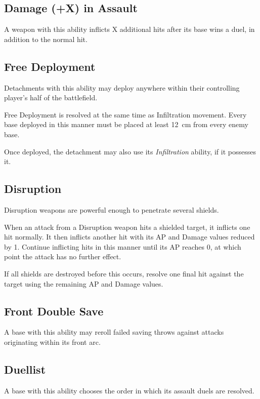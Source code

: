 \subsection{Damage (+X) in Assault}

A weapon with this ability inflicts X additional hits after its base wins a duel, in addition to the normal hit.

\subsection{Free Deployment}

Detachments with this ability may deploy anywhere within their controlling player's half of the battlefield.

Free Deployment is resolved at the same time as Infiltration movement. Every base deployed in this manner must be placed at least 12~cm from every enemy base.

Once deployed, the detachment may also use its \textit{Infiltration} ability, if it possesses it.

\subsection{Disruption}

Disruption weapons are powerful enough to penetrate several shields.

When an attack from a Disruption weapon hits a shielded target, it inflicts one hit normally. It then inflicts another hit with its AP and Damage values reduced by 1. Continue inflicting hits in this manner until its AP reaches 0, at which point the attack has no further effect.

If all shields are destroyed before this occurs, resolve one final hit against the target using the remaining AP and Damage values.

\subsection{Front Double Save}

A base with this ability may reroll failed saving throws against attacks originating within its front arc.

\subsection{Duellist}

A base with this ability chooses the order in which its assault duels are resolved.

